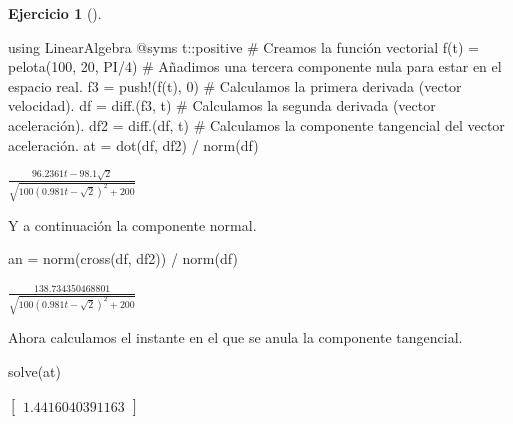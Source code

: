 \documentclass[
  a4paper,
]{scrreport}
\newenvironment{Shaded}{\begin{snugshade}}{\end{snugshade}}
\newcommand{\BuiltInTok}[1]{\textcolor[rgb]{0.00,0.23,0.31}{#1}}
\newcommand{\CommentTok}[1]{\textcolor[rgb]{0.37,0.37,0.37}{#1}}
\newcommand{\DataTypeTok}[1]{\textcolor[rgb]{0.68,0.00,0.00}{#1}}
\newcommand{\FloatTok}[1]{\textcolor[rgb]{0.68,0.00,0.00}{#1}}
\newcommand{\FunctionTok}[1]{\textcolor[rgb]{0.28,0.35,0.67}{#1}}
\newcommand{\ImportTok}[1]{\textcolor[rgb]{0.00,0.46,0.62}{#1}}
\newcommand{\NormalTok}[1]{\textcolor[rgb]{0.00,0.23,0.31}{#1}}
\newcommand{\OperatorTok}[1]{\textcolor[rgb]{0.37,0.37,0.37}{#1}}
\newcommand{\PreprocessorTok}[1]{\textcolor[rgb]{0.68,0.00,0.00}{#1}}
\theoremstyle{definition}
\newtheorem{exercise}{Ejercicio}[chapter]
\theoremstyle{remark}
\begin{document}
\begin{exercise}[]
\begin{enumerate}
\begin{tcolorbox}
\begin{Shaded}
\begin{Highlighting}[]
\ImportTok{using} \BuiltInTok{LinearAlgebra}
\PreprocessorTok{@syms}\NormalTok{ t}\OperatorTok{::}\DataTypeTok{positive}
\CommentTok{\# Creamos la función vectorial}
\FunctionTok{f}\NormalTok{(t) }\OperatorTok{=} \FunctionTok{pelota}\NormalTok{(}\FloatTok{100}\NormalTok{, }\FloatTok{20}\NormalTok{, PI}\OperatorTok{/}\FloatTok{4}\NormalTok{)}
\CommentTok{\# Añadimos una tercera componente nula para estar en el espacio real.}
\NormalTok{f3 }\OperatorTok{=} \FunctionTok{push!}\NormalTok{(}\FunctionTok{f}\NormalTok{(t), }\FloatTok{0}\NormalTok{)}
\CommentTok{\# Calculamos la primera derivada (vector velocidad).}
\NormalTok{df }\OperatorTok{=} \FunctionTok{diff}\NormalTok{.(f3, t)}
\CommentTok{\# Calculamos la segunda derivada (vector aceleración).}
\NormalTok{df2 }\OperatorTok{=} \FunctionTok{diff}\NormalTok{.(df, t)}
\CommentTok{\# Calculamos la componente tangencial del vector aceleración.}
\NormalTok{at }\OperatorTok{=} \FunctionTok{dot}\NormalTok{(df, df2) }\OperatorTok{/} \FunctionTok{norm}\NormalTok{(df)}
\end{Highlighting}
\end{Shaded}

  $\frac{96.2361 t - 98.1 \sqrt{2}}{\sqrt{100 \left(0.981 t - \sqrt{2}\right)^{2} + 200}}$

  Y a continuación la componente normal.

\begin{Shaded}
\begin{Highlighting}[]
\NormalTok{an }\OperatorTok{=} \FunctionTok{norm}\NormalTok{(}\FunctionTok{cross}\NormalTok{(df, df2)) }\OperatorTok{/} \FunctionTok{norm}\NormalTok{(df)}
\end{Highlighting}
\end{Shaded}

  $\frac{138.734350468801}{\sqrt{100 \left(0.981 t - \sqrt{2}\right)^{2} + 200}}$

  Ahora calculamos el instante en el que se anula la componente
  tangencial.

\begin{Shaded}
\begin{Highlighting}[]
\FunctionTok{solve}\NormalTok{(at)}
\end{Highlighting}
\end{Shaded}

  $\left[ \begin{array}{r}1.4416040391163\end{array} \right]$


\end{tcolorbox}
\end{enumerate}
\end{exercise}
\end{document}
